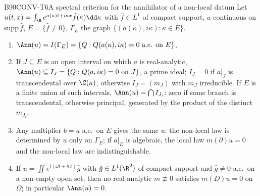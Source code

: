 \begin{dimcard}{B90}{CONV-T6}{A spectral criterion for the annihilator of a non-local datum}{\proved}{}
Let $u(t,x)=\int_\R e^{a(\kappa)t+i\kappa x}\hat f(\kappa)\dd\kappa$ with $\hat f\in L^1$ of compact support, $a$ continuous on $\mathrm{supp}\,\hat f$, $E=\{\hat f\ne0\}$, $\Gamma_E$ the graph $\{(a(\kappa),i\kappa):\kappa\in E\}$.
\begin{enumerate}[label=(\arabic*)]
\item $\Ann(u)=I(\Gamma_E)=\{Q:Q(a(\kappa),i\kappa)=0\ \text{a.e. on }E\}$.
\item If $J\subseteq E$ is an open interval on which $a$ is real-analytic, $\Ann(u)\subseteq I_J=\{Q:Q(a,i\kappa)=0\ \text{on }J\}$, a prime ideal; $I_J=0$ if $a|_J$ is transcendental over $\C(\kappa)$, otherwise $I_J=(m_J)$ with $m_J$ irreducible. If $E$ is a finite union of such intervals, $\Ann(u)=\bigcap I_{J_i}$: zero if some branch is transcendental, otherwise principal, generated by the product of the distinct $m_{J_i}$.
\item Any multiplier $b=a$ a.e.\ on $E$ gives the same $u$: the non-local law is determined by $u$ only on $\Gamma_E$; if $a|_E$ is algebraic, the local law $m(\partial)u=0$ and the non-local law are indistinguishable.
\item If $u=\iint e^{i(\omega t+\kappa x)}\hat g$ with $\hat g\in L^1(\R^2)$ of compact support and $\hat g\ne0$ a.e.\ on a non-empty open set, then no real-analytic $m\not\equiv0$ satisfies $m(D)u=0$ on $\Omega$; in particular $\Ann(u)=0$.
\end{enumerate}
\end{dimcard}

